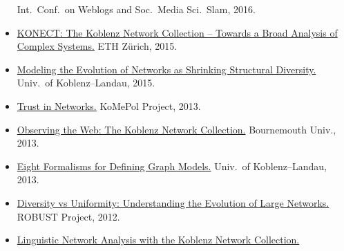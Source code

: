\documentclass[line,mm]{res}
\newcounter{x}
\newcounter{y}
\newcommand{\talknumber}{T\arabic{y}\stepcounter{y}}
\begin{document}
\begin{resume}
\begin{itemize}
    Int.\ Conf.\ on Weblogs and Soc.\ Media Sci.\ Slam, 2016. 
  \item[{[\talknumber]}] 
    \href{https://github.com/kunegis/pdfs/blob/master/kunegis:konect-eth.presentation.pdf}{KONECT:
      The Koblenz Network Collection -- Towards a Broad Analysis of Complex Systems.}  ETH Zürich, 2015.
  \item[{[\talknumber]}] 
    \href{https://github.com/kunegis/pdfs/blob/master/kunegis:shrinking-diversity.presentation.pdf}{Modeling
      the Evolution of Networks as Shrinking 
      Structural Diversity.}  Univ.\ of Koblenz--Landau, 2015. 
  \item[{[\talknumber]}]
    \href{https://github.com/kunegis/pdfs/blob/master/kunegis:konect-komepol.presentation.pdf}{Trust in Networks.}
    KoMePol Project, 2013. 
  \item[{[\talknumber]}] 
    \href{https://github.com/kunegis/pdfs/blob/master/kunegis:konect-bournemouth.presentation.pdf}{Observing
      the Web: The Koblenz Network Collection.}  Bournemouth Univ., 2013.
  \item[{[\talknumber]}] 
    \href{https://www.slideshare.net/kunegis/eight-ways}{Eight
      Formalisms for Defining Graph Models.}  Univ.\ of Koblenz--Landau,
    2013.  
  \item[{[\talknumber]}]
    \href{https://github.com/kunegis/pdfs/blob/master/kunegis:diversity-uniformity.presentation.pdf}{Diversity
      vs Uniformity:  Understanding the Evolution of Large Networks.}
    ROBUST Project, 2012. 
  \item[{[\talknumber]}] 
    \href{https://github.com/kunegis/pdfs/blob/master/kunegis:modeling-linguistic-networks.presentation.pdf}{Linguistic
      Network Analysis with the Koblenz Network Collection.}  

\end{itemize}
\end{resume}
\end{document}
